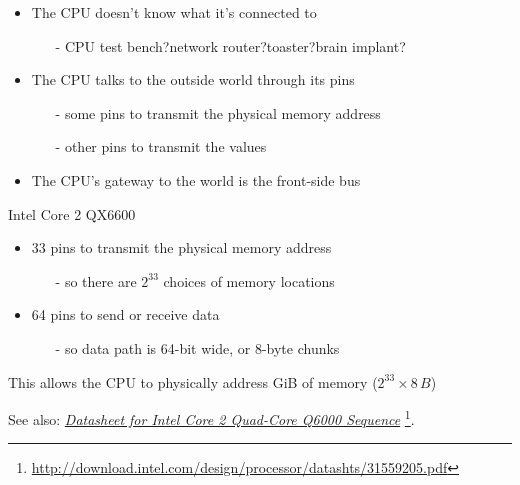 \begin{frame}
  \begin{itemize}
  \item The CPU doesn't know what it's connected to
    \begin{itemize}
    \item[-] CPU test bench?\quad{}network router?\quad{}toaster?\quad{}brain implant?
    \end{itemize}
  \item The CPU talks to the outside world through its pins
    \begin{itemize}
    \item[-] some pins to transmit the physical memory address
    \item[-] other pins to transmit the values
    \end{itemize}
  \item The CPU's gateway to the world is the \alert{front-side bus}
  \end{itemize}
  \begin{block}{Intel Core 2 QX6600}
    \begin{itemize}
    \item 33 pins to transmit the physical memory address
      \begin{itemize}
      \item[-] so there are \(2^{33}\) choices of memory locations
      \end{itemize}
    \item 64 pins to send or receive data
      \begin{itemize}
      \item[-] so data path is 64-bit wide, or 8-byte chunks
      \end{itemize}
    \end{itemize}
    This allows the CPU to physically address \unit[64]{GiB} of memory (\(2^{33}\times{}8\,B\))
  \end{block}
\end{frame}

See also:
\href{http://download.intel.com/design/processor/datashts/31559205.pdf}{\emph{Datasheet
    for Intel Core 2 Quad-Core Q6000 Sequence}}
\footnote{\url{http://download.intel.com/design/processor/datashts/31559205.pdf}}.

